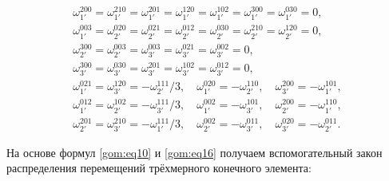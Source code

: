 \begin{gather}

\omega_{1'}^{200}=\omega_{1'}^{210}=\omega_{1'}^{201}=\omega_{1'}^{120}=\omega_{1'}^{102}=\omega_{1'}^{300}=\omega_{1'}^{030}=0,

\\

\omega_{1'}^{003}=\omega_{2'}^{020}=\omega_{2'}^{021}=\omega_{2'}^{012}=\omega_{2'}^{030}=\omega_{2'}^{210}=\omega_{2'}^{120}=0,

\\

\omega_{2'}^{300}=\omega_{2'}^{003}=\omega_{3'}^{003}=\omega_{3'}^{021}=\omega_{3'}^{002}=0,

\\

\label{gom:eq16}

\omega_{3'}^{300}=\omega_{3'}^{030}=\omega_{3'}^{201}=\omega_{3'}^{102}=\omega_{3'}^{012}=0,

\\

\omega_{1'}^{021}=\omega_{3'}^{120}=-\omega_{2'}^{111}/3, \quad  

\omega_{1'}^{020}=-\omega_{2'}^{110}, \quad 

\omega_{3'}^{200}=-\omega_{1'}^{101},

\\

\omega_{1'}^{012}=\omega_{2'}^{102}=-\omega_{3'}^{111}/3, \quad 

\omega_{1'}^{002}=-\omega_{3'}^{101}, \quad  

\omega_{2'}^{200}=-\omega_{1'}^{110},

\\

\omega_{2'}^{201}=\omega_{3'}^{210}=-\omega_{1'}^{111}/3, \quad 

\omega_{2'}^{002}=-\omega_{3'}^{011}, \quad 

\omega_{3'}^{020}=-\omega_{2'}^{011}. 

\end{gather}



На основе формул \eqref{gom:eq10} и \eqref{gom:eq16} получаем вспомогательный закон распределения перемещений трёхмерного конечного элемента:

